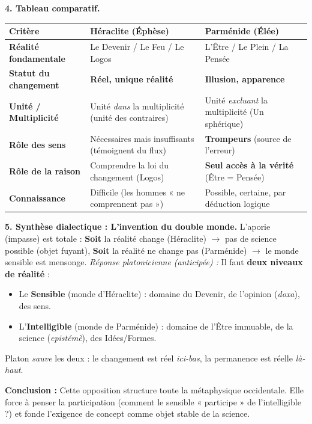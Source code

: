 \documentclass[11pt]{article}
\newcommand{\cle}[1]{{\popxbold\color{popdark}#1}}
\begin{document}
\begin{exoresolu}
\textbf{4. Tableau comparatif.}

\begin{center}
\begin{tabularx}{\linewidth}{|l|X|X|}
\hline
\rowcolor{popblueL}
\textbf{Critère} & \textbf{Héraclite (Éphèse)} & \textbf{Parménide (Élée)} \\
\hline
\textbf{Réalité fondamentale} & Le Devenir / Le Feu / Le Logos & L'Être / Le Plein / La Pensée \\
\hline
\textbf{Statut du changement} & \textbf{Réel, unique réalité} & \textbf{Illusion, apparence} \\
\hline
\textbf{Unité / Multiplicité} & Unité \emph{dans} la multiplicité (unité des contraires) & Unité \emph{excluant} la multiplicité (Un sphérique) \\
\hline
\textbf{Rôle des sens} & Nécessaires mais insuffisants (témoignent du flux) & \textbf{Trompeurs} (source de l'erreur) \\
\hline
\textbf{Rôle de la raison} & Comprendre la loi du changement (Logos) & \textbf{Seul accès à la vérité} (Être = Pensée) \\
\hline
\textbf{Connaissance} & Difficile (les hommes « ne comprennent pas ») & Possible, certaine, par déduction logique \\
\hline
\end{tabularx}
\end{center}

\textbf{5. Synthèse dialectique : L'invention du double monde.}
L'aporie (impasse) est totale : \textbf{Soit} la réalité change (Héraclite) $\rightarrow$ pas de science possible (objet fuyant), \textbf{Soit} la réalité ne change pas (Parménide) $\rightarrow$ le monde sensible est mensonge.
\emph{Réponse platonicienne (anticipée) :} Il faut \textbf{deux niveaux de réalité} :
\begin{itemize}
    \item Le \textbf{Sensible} (monde d'Héraclite) : domaine du Devenir, de l'opinion (\emph{doxa}), des sens.
    \item L'\textbf{Intelligible} (monde de Parménide) : domaine de l'Être immuable, de la science (\emph{epistémè}), des Idées/Formes.
\end{itemize}
Platon \emph{sauve} les deux : le changement est réel \emph{ici-bas}, la permanence est réelle \emph{là-haut}.

\textbf{Conclusion :} Cette opposition structure toute la métaphysique occidentale. Elle force à penser la \cle{participation} (comment le sensible « participe » de l'intelligible ?) et fonde l'exigence de \cle{concept} comme objet stable de la science.
\end{exoresolu}
\end{document}
